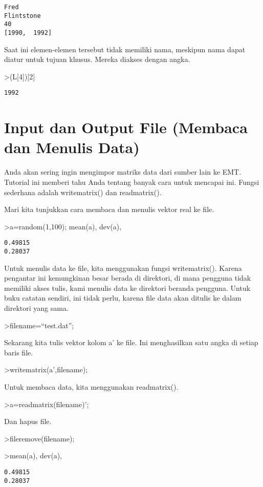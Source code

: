 \documentclass[
]{book}
\begin{document}
\begin{verbatim}
Fred
Flintstone
40
[1990,  1992]
\end{verbatim}

Saat ini elemen-elemen tersebut tidak memiliki nama, meskipun nama dapat diatur untuk tujuan khusus. Mereka diakses dengan angka.

\textgreater(L{[}4{]}){[}2{]}

\begin{verbatim}
1992
\end{verbatim}

\section{Input dan Output File (Membaca dan Menulis Data)}\label{input-dan-output-file-membaca-dan-menulis-data}

Anda akan sering ingin mengimpor matriks data dari sumber lain ke EMT. Tutorial ini memberi tahu Anda tentang banyak cara untuk mencapai ini. Fungsi sederhana adalah writematrix() dan readmatrix().

Mari kita tunjukkan cara membaca dan menulis vektor real ke file.

\textgreater a=random(1,100); mean(a), dev(a),

\begin{verbatim}
0.49815
0.28037
\end{verbatim}

Untuk menulis data ke file, kita menggunakan fungsi writematrix(). Karena pengantar ini kemungkinan besar berada di direktori, di mana pengguna tidak memiliki akses tulis, kami menulis data ke direktori beranda pengguna. Untuk buku catatan sendiri, ini tidak perlu, karena file data akan ditulis ke dalam direktori yang sama.

\textgreater filename=``test.dat'';

Sekarang kita tulis vektor kolom a' ke file. Ini menghasilkan satu angka di setiap baris file.

\textgreater writematrix(a',filename);

Untuk membaca data, kita menggunakan readmatrix().

\textgreater a=readmatrix(filename)';

Dan hapus file.

\textgreater fileremove(filename);

\textgreater mean(a), dev(a),

\begin{verbatim}
0.49815
0.28037
\end{verbatim}
\end{document}
